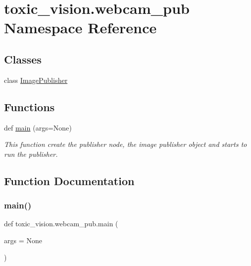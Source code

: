 \hypertarget{namespacetoxic__vision_1_1webcam__pub}{}\section{toxic\+\_\+vision.\+webcam\+\_\+pub Namespace Reference}
\label{namespacetoxic__vision_1_1webcam__pub}
\subsection*{Classes}
\begin{DoxyCompactItemize}
\item 
class \mbox{\hyperlink{classtoxic__vision_1_1webcam__pub_1_1ImagePublisher}{Image\+Publisher}}
\end{DoxyCompactItemize}
\subsection*{Functions}
\begin{DoxyCompactItemize}
\item 
def \mbox{\hyperlink{namespacetoxic__vision_1_1webcam__pub_a0d57aeae4d44f1dcb33eed5082cf3c87}{main}} (args=None)
\begin{DoxyCompactList}\small\item\em This function create the publisher node, the image publisher object and starts to run the publisher. \end{DoxyCompactList}\end{DoxyCompactItemize}


\subsection{Function Documentation}
\mbox{\label{namespacetoxic__vision_1_1webcam__pub_a0d57aeae4d44f1dcb33eed5082cf3c87}} 
\subsubsection{\texorpdfstring{main()}{main()}}
{\footnotesize\ttfamily def toxic\+\_\+vision.\+webcam\+\_\+pub.\+main (\begin{DoxyParamCaption}\item[{}]{args = {\ttfamily None} }\end{DoxyParamCaption})}



